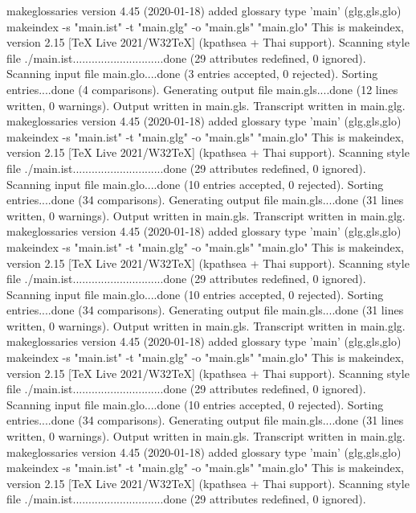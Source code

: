 makeglossaries version 4.45 (2020-01-18)
added glossary type 'main' (glg,gls,glo)
makeindex  -s "main.ist" -t "main.glg" -o "main.gls" "main.glo"
This is makeindex, version 2.15 [TeX Live 2021/W32TeX] (kpathsea + Thai support).
Scanning style file ./main.ist.............................done (29 attributes redefined, 0 ignored).
Scanning input file main.glo....done (3 entries accepted, 0 rejected).
Sorting entries....done (4 comparisons).
Generating output file main.gls....done (12 lines written, 0 warnings).
Output written in main.gls.
Transcript written in main.glg.
makeglossaries version 4.45 (2020-01-18)
added glossary type 'main' (glg,gls,glo)
makeindex  -s "main.ist" -t "main.glg" -o "main.gls" "main.glo"
This is makeindex, version 2.15 [TeX Live 2021/W32TeX] (kpathsea + Thai support).
Scanning style file ./main.ist.............................done (29 attributes redefined, 0 ignored).
Scanning input file main.glo....done (10 entries accepted, 0 rejected).
Sorting entries....done (34 comparisons).
Generating output file main.gls....done (31 lines written, 0 warnings).
Output written in main.gls.
Transcript written in main.glg.
makeglossaries version 4.45 (2020-01-18)
added glossary type 'main' (glg,gls,glo)
makeindex  -s "main.ist" -t "main.glg" -o "main.gls" "main.glo"
This is makeindex, version 2.15 [TeX Live 2021/W32TeX] (kpathsea + Thai support).
Scanning style file ./main.ist.............................done (29 attributes redefined, 0 ignored).
Scanning input file main.glo....done (10 entries accepted, 0 rejected).
Sorting entries....done (34 comparisons).
Generating output file main.gls....done (31 lines written, 0 warnings).
Output written in main.gls.
Transcript written in main.glg.
makeglossaries version 4.45 (2020-01-18)
added glossary type 'main' (glg,gls,glo)
makeindex  -s "main.ist" -t "main.glg" -o "main.gls" "main.glo"
This is makeindex, version 2.15 [TeX Live 2021/W32TeX] (kpathsea + Thai support).
Scanning style file ./main.ist.............................done (29 attributes redefined, 0 ignored).
Scanning input file main.glo....done (10 entries accepted, 0 rejected).
Sorting entries....done (34 comparisons).
Generating output file main.gls....done (31 lines written, 0 warnings).
Output written in main.gls.
Transcript written in main.glg.
makeglossaries version 4.45 (2020-01-18)
added glossary type 'main' (glg,gls,glo)
makeindex  -s "main.ist" -t "main.glg" -o "main.gls" "main.glo"
This is makeindex, version 2.15 [TeX Live 2021/W32TeX] (kpathsea + Thai support).
Scanning style file ./main.ist.............................done (29 attributes redefined, 0 ignored).

